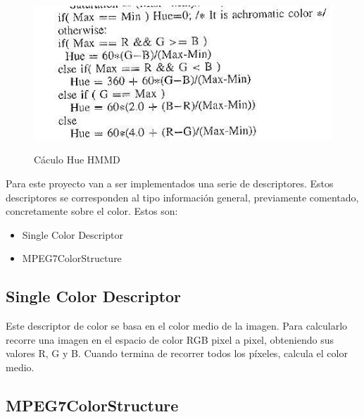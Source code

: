 \begin{figure}[H] %
\centering
\includegraphics[scale=0.7]{imagenes/hmmd2.jpg}  %
\label{hmmd2.jpg}
\caption{Cáculo Hue HMMD}
\end{figure}


Para este proyecto van a ser implementados una serie de descriptores. Estos descriptores se corresponden al tipo información general, previamente comentado, concretamente sobre el color. Estos son:

\begin{itemize}

\item Single Color Descriptor

\item MPEG7ColorStructure

\end{itemize}

\subsection{Single Color Descriptor}

Este descriptor de color se basa en el color medio de la imagen. Para calcularlo recorre una imagen en el espacio de color RGB pixel a pixel, obteniendo sus valores R, G y B. Cuando termina de recorrer todos los píxeles, calcula el color medio.

\subsection{MPEG7ColorStructure}

